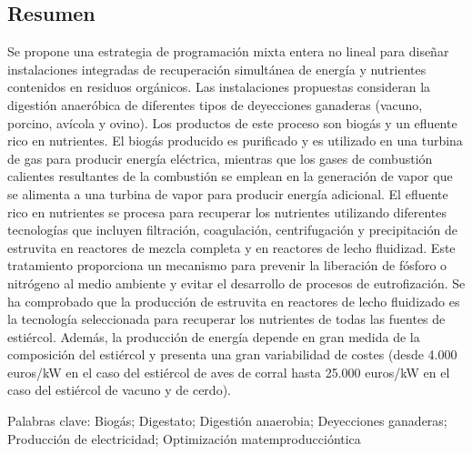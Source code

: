\begin{refsection}[referencesCh2]
\section*{Resumen}
Se propone una estrategia de programación mixta entera no lineal para diseñar instalaciones integradas de recuperación simultánea de energía y nutrientes contenidos en residuos orgánicos. Las instalaciones propuestas consideran la digestión anaeróbica de diferentes tipos de deyecciones ganaderas (vacuno, porcino, avícola y ovino). Los productos de este proceso son biogás y un efluente rico en nutrientes. El biogás producido es purificado y es utilizado en una turbina de gas para producir energía eléctrica, mientras que los gases de combustión calientes resultantes de la combustión se emplean en la generación de vapor que se alimenta a una turbina de vapor para producir energía adicional. El efluente rico en nutrientes se procesa para recuperar los nutrientes utilizando diferentes tecnologías que incluyen filtración, coagulación, centrifugación y precipitación de estruvita en reactores de mezcla completa y en reactores de lecho fluidizad. Este tratamiento proporciona un mecanismo para prevenir la liberación de fósforo o nitrógeno al medio ambiente y evitar el desarrollo de procesos de eutrofización. Se ha comprobado que la producción de estruvita en reactores de lecho fluidizado es la tecnología seleccionada para recuperar los nutrientes de todas las fuentes de estiércol. Además, la producción de energía depende en gran medida de la composición del estiércol y presenta una gran variabilidad de costes (desde 4.000 euros/kW en el caso del estiércol de aves de corral hasta 25.000 euros/kW en el caso del estiércol de vacuno y de cerdo).

\bigskip
Palabras clave: Biogás; Digestato; Digestión anaerobia; Deyecciones ganaderas; Producción de electricidad; Optimización matemproduccióntica


\newpage


\end{refsection}
